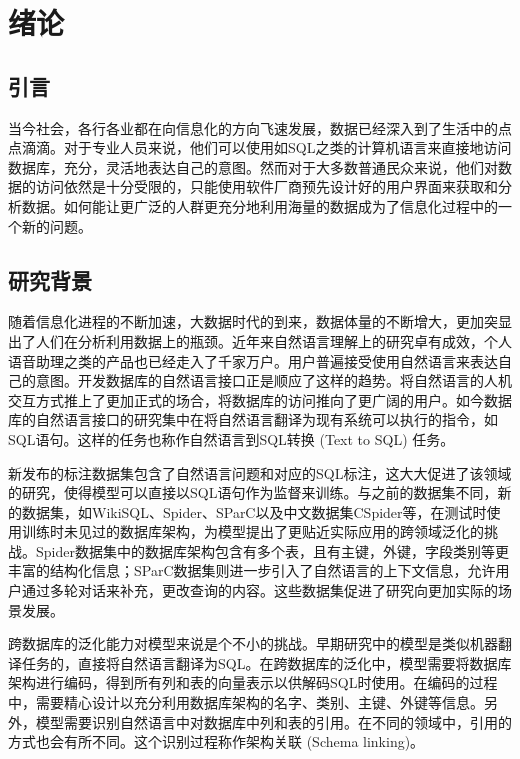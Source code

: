 
\chapter{绪论}

\section{引言}

当今社会，各行各业都在向信息化的方向飞速发展，数据已经深入到了生活中的点点滴滴。对于专业人员来说，他们可以使用如SQL之类的计算机语言来直接地访问数据库，充分，灵活地表达自己的意图。然而对于大多数普通民众来说，他们对数据的访问依然是十分受限的，只能使用软件厂商预先设计好的用户界面来获取和分析数据。如何能让更广泛的人群更充分地利用海量的数据成为了信息化过程中的一个新的问题。

\section{研究背景}

随着信息化进程的不断加速，大数据时代的到来，数据体量的不断增大，更加突显出了人们在分析利用数据上的瓶颈。近年来自然语言理解上的研究卓有成效，个人语音助理之类的产品也已经走入了千家万户。用户普遍接受使用自然语言来表达自己的意图。开发数据库的自然语言接口正是顺应了这样的趋势。将自然语言的人机交互方式推上了更加正式的场合，将数据库的访问推向了更广阔的用户。如今数据库的自然语言接口的研究集中在将自然语言翻译为现有系统可以执行的指令，如SQL语句。这样的任务也称作自然语言到SQL转换 (Text to SQL) 任务。

新发布的标注数据集包含了自然语言问题和对应的SQL标注，这大大促进了该领域的研究，使得模型可以直接以SQL语句作为监督来训练。与之前的数据集不同，新的数据集，如WikiSQL\cite{seq2sql17}、Spider\cite{spider18}、SParC\cite{sparc19}以及中文数据集CSpider\cite{cspider19}等，在测试时使用训练时未见过的数据库架构，为模型提出了更贴近实际应用的跨领域泛化的挑战。Spider数据集中的数据库架构包含有多个表，且有主键，外键，字段类别等更丰富的结构化信息；SParC数据集则进一步引入了自然语言的上下文信息，允许用户通过多轮对话来补充，更改查询的内容。这些数据集促进了研究向更加实际的场景发展。

跨数据库的泛化能力对模型来说是个不小的挑战。早期研究中的模型是类似机器翻译任务的，直接将自然语言翻译为SQL。在跨数据库的泛化中，模型需要将数据库架构进行编码，得到所有列和表的向量表示以供解码SQL时使用。在编码的过程中，需要精心设计以充分利用数据库架构的名字、类别、主键、外键等信息。另外，模型需要识别自然语言中对数据库中列和表的引用。在不同的领域中，引用的方式也会有所不同。这个识别过程称作架构关联 (Schema linking)。

